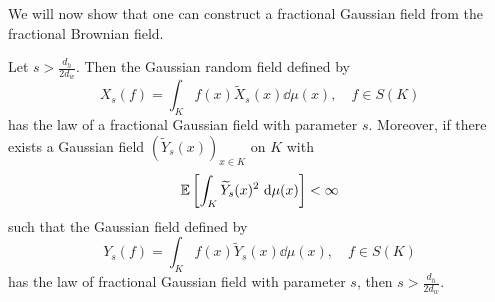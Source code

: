\medskip
We will now show that one can construct a fractional Gaussian field from the fractional Brownian field.
\begin{prop}
	Let $s > \frac{d_h}{2d_w}$. Then the Gaussian random field defined by
	\begin{equation}
		X_s(f) = \int_{K}f(x) \widetilde{X}_{s}(x) \dd \mu (x), \quad f \in S(K)
	\end{equation}
	has the law of a fractional Gaussian field with parameter $s$. Moreover, if there exists a Gaussian field $\left(\widetilde{Y}_{s}(x)\right)_{x \in K}$ on $K$ with
	\begin{equation}
		\mathbb{E} \left[\int_{K}\widetilde{Y}_s(x)^2 \ \text{d} \mu(x)\right] < \infty
	\end{equation}
	such that the Gaussian field defined by
	\begin{equation}
		Y_s(f) = \int_{K}f(x) \widetilde{Y}_{s}(x) \dd \mu (x), \quad f \in S(K)
	\end{equation}
	has the law of fractional Gaussian field with parameter $s$, then $s > \frac{d_h}{2d_w}$.
\end{prop}
